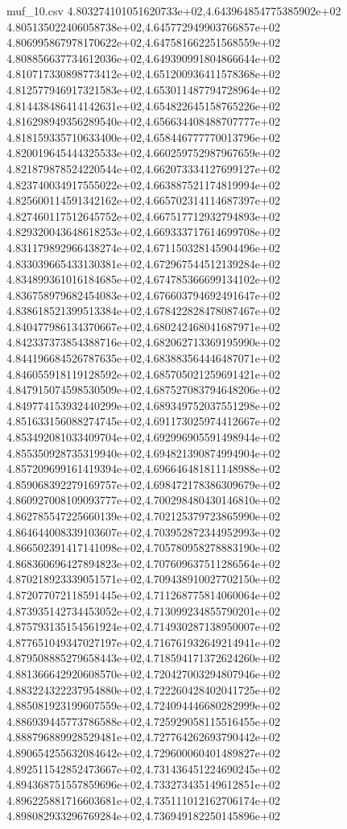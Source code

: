 \begin{filecontents*}{muf_10.csv}
4.803274101051620733e+02,4.643964854775385902e+02
4.805135022406058738e+02,4.645772949903766857e+02
4.806995867978170622e+02,4.647581662251568559e+02
4.808856637734612036e+02,4.649390991804866644e+02
4.810717330898773412e+02,4.651200936411578368e+02
4.812577946917321583e+02,4.653011487794728964e+02
4.814438486414142631e+02,4.654822645158765226e+02
4.816298949356289540e+02,4.656634408488707777e+02
4.818159335710633400e+02,4.658446777770013796e+02
4.820019645444325533e+02,4.660259752987967659e+02
4.821879878524220544e+02,4.662073334127699127e+02
4.823740034917555022e+02,4.663887521174819994e+02
4.825600114591342162e+02,4.665702314114687397e+02
4.827460117512645752e+02,4.667517712932794893e+02
4.829320043648618253e+02,4.669333717614699708e+02
4.831179892966438274e+02,4.671150328145904496e+02
4.833039665433130381e+02,4.672967544512139284e+02
4.834899361016184685e+02,4.674785366699134102e+02
4.836758979682454083e+02,4.676603794692491647e+02
4.838618521399513384e+02,4.678422828478087467e+02
4.840477986134370667e+02,4.680242468041687971e+02
4.842337373854388716e+02,4.682062713369195990e+02
4.844196684526787635e+02,4.683883564446487071e+02
4.846055918119128592e+02,4.685705021259691421e+02
4.847915074598530509e+02,4.687527083794648206e+02
4.849774153932440299e+02,4.689349752037551298e+02
4.851633156088274745e+02,4.691173025974412667e+02
4.853492081033409704e+02,4.692996905591498944e+02
4.855350928735319940e+02,4.694821390874994904e+02
4.857209699161419394e+02,4.696646481811148988e+02
4.859068392279169757e+02,4.698472178386309679e+02
4.860927008109093777e+02,4.700298480430146810e+02
4.862785547225660139e+02,4.702125379723865990e+02
4.864644008339103607e+02,4.703952872344952993e+02
4.866502391417141098e+02,4.705780958278883190e+02
4.868360696427894823e+02,4.707609637511286564e+02
4.870218923339051571e+02,4.709438910027702150e+02
4.872077072118591445e+02,4.711268775814060064e+02
4.873935142734453052e+02,4.713099234855790201e+02
4.875793135154561924e+02,4.714930287138950007e+02
4.877651049347027197e+02,4.716761932649214941e+02
4.879508885279658443e+02,4.718594171372624260e+02
4.881366642920608570e+02,4.720427003294807946e+02
4.883224322237954880e+02,4.722260428402041725e+02
4.885081923199607559e+02,4.724094446680282999e+02
4.886939445773786588e+02,4.725929058115516455e+02
4.888796889928529481e+02,4.727764262693790442e+02
4.890654255632084642e+02,4.729600060401489827e+02
4.892511542852473667e+02,4.731436451224690245e+02
4.894368751557859696e+02,4.733273435149612851e+02
4.896225881716603681e+02,4.735111012162706174e+02
4.898082933296769284e+02,4.736949182250145896e+02

\end{filecontents*}
